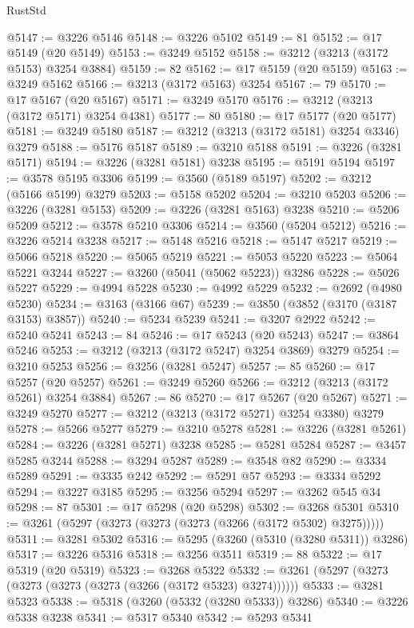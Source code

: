\begin{lexlean}{RustStd}
\begin{coremodule}
{\begin{coremodule}
{{{{{{{{{{{{{{{{{{{{{{{{{{@5147 := @3226 @5146
@5148 := @3226 @5102
@5149 := 81
@5152 := @17 @5149 (@20 @5149)
@5153 := @3249 @5152
@5158 := @3212 (@3213 (@3172 @5153) @3254 @3884)
@5159 := 82
@5162 := @17 @5159 (@20 @5159)
@5163 := @3249 @5162
@5166 := @3213 (@3172 @5163) @3254
@5167 := 79
@5170 := @17 @5167 (@20 @5167)
@5171 := @3249 @5170
@5176 := @3212 (@3213 (@3172 @5171) @3254 @4381)
@5177 := 80
@5180 := @17 @5177 (@20 @5177)
@5181 := @3249 @5180
@5187 := @3212 (@3213 (@3172 @5181) @3254 @3346) @3279
@5188 := @5176 @5187
@5189 := @3210 @5188
@5191 := @3226 (@3281 @5171)
@5194 := @3226 (@3281 @5181) @3238
@5195 := @5191 @5194
@5197 := @3578 @5195 @3306
@5199 := @3560 (@5189 @5197)
@5202 := @3212 (@5166 @5199) @3279
@5203 := @5158 @5202
@5204 := @3210 @5203
@5206 := @3226 (@3281 @5153)
@5209 := @3226 (@3281 @5163) @3238
@5210 := @5206 @5209
@5212 := @3578 @5210 @3306
@5214 := @3560 (@5204 @5212)
@5216 := @3226 @5214 @3238
@5217 := @5148 @5216
@5218 := @5147 @5217
@5219 := @5066 @5218
@5220 := @5065 @5219
@5221 := @5053 @5220
@5223 := @5064 @5221 @3244
@5227 := @3260 (@5041 (@5062 @5223)) @3286
@5228 := @5026 @5227
@5229 := @4994 @5228
@5230 := @4992 @5229
@5232 := @2692 (@4980 @5230)
@5234 := @3163 (@3166 @67)
@5239 := @3850 (@3852 (@3170 (@3187 @3153) @3857))
@5240 := @5234 @5239
@5241 := @3207 @2922
@5242 := @5240 @5241
@5243 := 84
@5246 := @17 @5243 (@20 @5243)
@5247 := @3864 @5246
@5253 := @3212 (@3213 (@3172 @5247) @3254 @3869) @3279
@5254 := @3210 @5253
@5256 := @3256 (@3281 @5247)
@5257 := 85
@5260 := @17 @5257 (@20 @5257)
@5261 := @3249 @5260
@5266 := @3212 (@3213 (@3172 @5261) @3254 @3884)
@5267 := 86
@5270 := @17 @5267 (@20 @5267)
@5271 := @3249 @5270
@5277 := @3212 (@3213 (@3172 @5271) @3254 @3380) @3279
@5278 := @5266 @5277
@5279 := @3210 @5278
@5281 := @3226 (@3281 @5261)
@5284 := @3226 (@3281 @5271) @3238
@5285 := @5281 @5284
@5287 := @3457 @5285 @3244
@5288 := @3294 @5287
@5289 := @3548 @82
@5290 := @3334 @5289
@5291 := @3335 @242
@5292 := @5291 @57
@5293 := @3334 @5292
@5294 := @3227 @3185
@5295 := @3256 @5294
@5297 := @3262 @545 @34
@5298 := 87
@5301 := @17 @5298 (@20 @5298)
@5302 := @3268 @5301
@5310 := @3261 (@5297 (@3273 (@3273 (@3273 (@3266 (@3172 @5302) @3275)))))
@5311 := @3281 @5302
@5316 := @5295 (@3260 (@5310 (@3280 @5311)) @3286)
@5317 := @3226 @5316
@5318 := @3256 @3511
@5319 := 88
@5322 := @17 @5319 (@20 @5319)
@5323 := @3268 @5322
@5332 := @3261 (@5297 (@3273 (@3273 (@3273 (@3273 (@3266 (@3172 @5323) @3274))))))
@5333 := @3281 @5323
@5338 := @5318 (@3260 (@5332 (@3280 @5333)) @3286)
@5340 := @3226 @5338 @3238
@5341 := @5317 @5340
@5342 := @5293 @5341
}}}}}}}}}}}}}}}}}}}}}}}}}}
\end{coremodule}}
\end{coremodule}
\end{lexlean}
